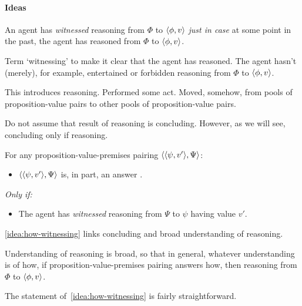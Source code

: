 \paragraph{Ideas}
\label{sec:clar:expand:qHow:ideas}

\begin{note}
  \begin{definition}[Witnessing]
    An agent has \emph{witnessed} reasoning from \(\Phi\) to \(\langle \phi, v \rangle\) \emph{just in case} at some point in the past, the agent has reasoned from \(\Phi\) to \(\langle \phi, v \rangle\).
  \end{definition}

  Term `witnessing' to make it clear that the agent has reasoned.
  The agent hasn't (merely), for example, entertained or forbidden reasoning from \(\Phi\) to \(\langle \phi, v \rangle\).

  This introduces reasoning.
  Performed some act.
  Moved, somehow, from pools of proposition-value pairs to other pools of proposition-value pairs.

  Do not assume that result of reasoning is concluding.
  However, as we will see, concluding only if reasoning.
\end{note}

\begin{note}
  \begin{idea}[\ideaWitness{}]
    \label{idea:how-witnessing}
    For any proposition-value-premises pairing \(\langle \langle \psi, v' \rangle, \Psi \rangle\):
    \begin{itemize}
    \item
      \(\langle \langle \psi, v' \rangle, \Psi \rangle\) is, in part, an answer \qHow{}.
    \end{itemize}
    \emph{Only if:}
    \begin{itemize}
    \item
      The agent has \emph{witnessed} reasoning from \(\Psi\) to \(\psi\) having value \(v'\).
    \end{itemize}
  \end{idea}

  \autoref{idea:how-witnessing} links concluding and broad understanding of reasoning.

  Understanding of reasoning is broad, so that in general, whatever understanding is of how, if proposition-value-premises pairing answers how, then reasoning from \(\Phi\) to \(\langle \phi, v \rangle\).

  The statement of~\autoref{idea:how-witnessing} is fairly straightforward.
\end{note}

